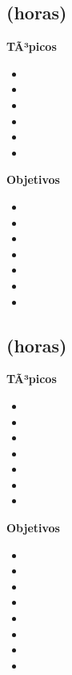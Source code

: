\subsection{\OSUNODef  (\OSUNOHours horas)}\label{sec:BOK-OS1}

\textbf{TÃ³picos}
\begin{itemize}
	\item \OSUNOTopicRol
	\item \OSUNOTopicHistoria
	\item \OSUNOTopicFuncionalidad
	\item \OSUNOTopicMecanismos
	\item \OSUNOTopicTopicos
	\item \OSUNOTopicInfluencias
\end{itemize}

\textbf{Objetivos}
\begin{itemize}
	\item \OSUNOObjUNO
	\item \OSUNOObjDOS
	\item \OSUNOObjTRES
	\item \OSUNOObjCUATRO
	\item \OSUNOObjCINCO
	\item \OSUNOObjSEIS
	\item \OSUNOObjSIETE
\end{itemize}

\subsection{\OSDOSDef  (\OSDOSHours horas)}\label{sec:BOK-OS2}

\textbf{TÃ³picos}
\begin{itemize}
	\item \OSDOSTopicMetodos
	\item \OSDOSTopicAbstracciones
	\item \OSDOSTopicConceptos
	\item \OSDOSTopicNecesidad
	\item \OSDOSTopicOrganizacion
	\item \OSDOSTopicInterrupciones
	\item \OSDOSTopicConcepto
\end{itemize}

\textbf{Objetivos}
\begin{itemize}
	\item \OSDOSObjUNO
	\item \OSDOSObjDOS
	\item \OSDOSObjTRES
	\item \OSDOSObjCUATRO
	\item \OSDOSObjCINCO
	\item \OSDOSObjSEIS
	\item \OSDOSObjSIETE
	\item \OSDOSObjOCHO
\end{itemize}

